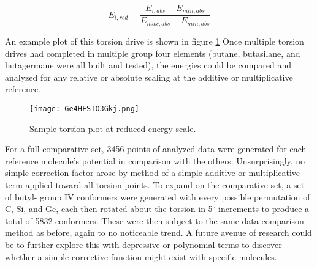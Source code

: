 \begin{equation}
E_{i, red} = \frac{E_{i,abs} - E_{min,abs}}{E_{max,abs}-E_{min,abs}}
\label{eq:TorsionReducedScale}
\end{equation}

An example plot of this torsion drive is shown in figure \ref{fig:EXTorsion} Once multiple torsion drives had completed in multiple group four elements (butane, butasilane, and butagermane were all built and tested), the energies could be compared and analyzed for any relative or absolute scaling at the additive or multiplicative reference. 

\begin{figure}
	
	\centering
	
	\texttt{[image: Ge4HFSTO3Gkj.png]}
	
	\caption{Sample torsion plot at reduced energy scale.}
	
	\label{fig:EXTorsion}
	
\end{figure}

For a full comparative set, 3456 points of analyzed data were generated for each reference molecule's potential in comparison with the others. 
Unsurprisingly, no simple correction factor arose by method of a simple additive or multiplicative term applied toward all torsion points. 
To expand on the comparative set, a set of butyl- group IV conformers were generated with every possible permutation of C, Si, and Ge, each then rotated about the torsion in 5$^{\circ}$ increments to produce a total of 5832 conformers.
These were then subject to the same data comparison method as before, again to no noticeable trend.
A future avenue of research could be to further explore this with depressive or polynomial terms to discover whether a simple corrective function might exist with specific molecules.

